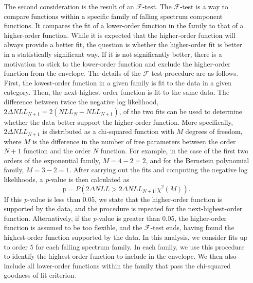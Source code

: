 The second consideration is the result of an $\mathcal{F}$-test. The $\mathcal{F}$-test is a way to compare functions within a specific family of 
falling spectrum component functions. It compares the fit of a lower-order function in the family to that of a higher-order function. 
While it is expected that the higher-order function will always provide a better fit, the question is whether the higher-order 
fit is better in a statistically significant way. If it is not significantly better, there is a motivation to stick to the lower-order function and exclude the higher-order function from the envelope. 
The details of the $\mathcal{F}$-test procedure are as follows. 
First, the lowest-order function in a given family is fit to the data in a given
category. Then, the next-highest-order function is fit to the same data. The difference between twice 
the negative log likelihood, $2\Delta NLL_{N+1} = 2(NLL_{N}-NLL_{N+1})$, of the two fits
can be used to determine whether the data better support the higher-order function. 
More specifically, $2\Delta NLL_{N+1}$ is distributed as a chi-squared function with $M$ degrees of 
freedom, where $M$ is the difference in the number of free parameters between the order $N+1$ 
function and the order $N$ function. For example, in the case of the first two orders of 
the exponential family, $M = 4-2 = 2$, and for the Bernstein polynomial family, $M=3-2=1$. 
After carrying out the fits and computing the negative log likelihoods, a \textit{p}-value is then calculated as 
\begin{equation}
\mathrm{p} = P(2\Delta NLL > 2\Delta NLL_{N+1} | \chi^{2}(M)).
\end{equation}
If this \textit{p}-value is less than 0.05, we state that the higher-order function is supported by the 
data, and the procedure is repeated for the next-highest-order function. Alternatively, if the 
\textit{p}-value is greater than 0.05, the higher-order function is assumed to be too flexible, 
and the $\mathcal{F}$-test ends, having found the highest-order function supported by the data.
In this analysis, we consider fits up to order 5 for each falling spectrum family.
In each family, we use this procedure to identify the highest-order function to include in the envelope. 
We then also include all lower-order functions within the family that pass the chi-squared goodness of fit criterion.

